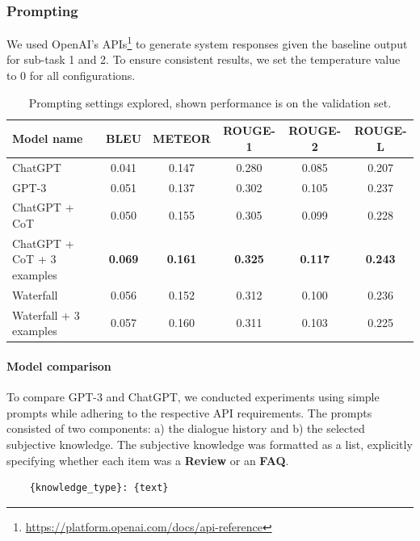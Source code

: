 \documentclass[11pt]{article}
\begin{document}
\subsubsection{Prompting}
We used OpenAI's APIs\footnote{\url{https://platform.openai.com/docs/api-reference}} to generate system responses given the baseline output for sub-task 1 and 2. To ensure consistent results, we set the temperature value to 0 for all configurations.

\begin{table}[!h]
    \centering
    \begin{tabular}{@{}lccccc@{}}
    \toprule
        \textbf{Model name} & \textbf{BLEU} & \textbf{METEOR} & \textbf{ROUGE-1} & \textbf{ROUGE-2} & \textbf{ROUGE-L} \\
    \midrule
        ChatGPT                               & 0.041 & 0.147 & 0.280 & 0.085 & 0.207 \\
        GPT-3                             & 0.051 & 0.137 & 0.302 & 0.105 & 0.237 \\
        ChatGPT + CoT              & 0.050 & 0.155 & 0.305 & 0.099 & 0.228 \\
        ChatGPT + CoT + 3 examples & \textbf{0.069} & \textbf{0.161} & \textbf{0.325} & \textbf{0.117} & \textbf{0.243} \\
        Waterfall                            & 0.056 & 0.152 & 0.312 & 0.100 & 0.236 \\
        Waterfall + 3 examples               & 0.057 & 0.160 & 0.311 & 0.103 & 0.225 \\
    \bottomrule
    \end{tabular}
    \caption{Prompting settings explored, shown performance is on the validation set. }
    \label{table:prompting}
\end{table}

\paragraph{Model comparison}
To compare GPT-3 and ChatGPT, we conducted experiments using simple prompts while adhering to the respective API requirements. The prompts consisted of two components: a) the dialogue history and b) the selected subjective knowledge. The subjective knowledge was formatted as a list, explicitly specifying whether each item was a \textbf{Review} or an \textbf{FAQ}.

\begin{verbatim}
    {knowledge_type}: {text}
\end{verbatim}
\end{document}
